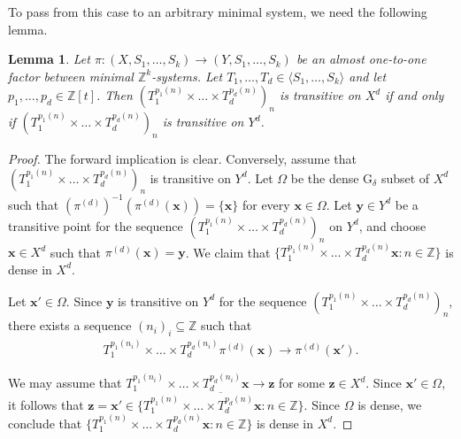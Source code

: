 \documentclass[11pt,reqno]{amsart}
\newcommand{\Z}{\mathbb{Z}}
\newcommand{\bx}{{\boldsymbol x}}
\newcommand{\by}{{\boldsymbol y}}
\newcommand{\bz}{{\boldsymbol z}}
\newtheorem{lemma}[lemma]{Lemma}
\theoremstyle{definition}
\theoremstyle{remark}
\begin{document}
To pass from this case to an arbitrary minimal system, we need the following lemma.

\begin{lemma}\label{lemma: lift_transitive_almost_onetoone}
    Let $\pi\colon (X,S_1,\dots,S_k)\to (Y,S_1,\dots,S_k)$ be an almost one-to-one factor between minimal $\Z^k$-systems. Let $T_1,\dots,T_d\in \langle S_1,\dots,S_k\rangle$ and let $p_1,\dots,p_d\in \Z[t]$. Then $(T_1^{p_1(n)}\times \dots\times T_{d}^{p_{d}(n)})_{n}$ is transitive on $X^d$ if and only if $(T_1^{p_1(n)}\times \dots\times T_{d}^{p_{d}(n)})_{n}$ is transitive on $Y^d$.
\end{lemma}


\begin{proof}
    The forward implication is clear. Conversely, assume that $(T_1^{p_1(n)}\times \dots\times T_{d}^{p_{d}(n)})_{n}$ is transitive on $Y^d$. Let $\Omega$ be the dense G$_\delta$ subset of $X^d$ such that $(\pi^{(d)})^{-1}(\pi^{(d)}(\bx))=\{\bx\}$ for every $\bx\in\Omega$. Let $\by\in Y^d$ be a transitive point for the sequence $(T_1^{p_1(n)}\times \dots\times T_{d}^{p_{d}(n)})_{n}$ on $Y^d$, and choose $\bx\in X^d$ such that $\pi^{(d)}(\bx)=\by$. We claim that $\{T_1^{p_1(n)}\times \dots\times T_{d}^{p_{d}(n)} \bx:n\in \Z\}$ is dense in $X^d$. 

    Let $\bx'\in \Omega$. Since $\by$ is transitive on $Y^d$ for the sequence $(T_1^{p_1(n)}\times \dots\times T_{d}^{p_{d}(n)})_{n}$, there exists a sequence $(n_i)_i\subseteq \Z$ such that \begin{align*}
        T_1^{p_1(n_i)}\times \dots\times T_{d}^{p_{d}(n_i)} \pi^{(d)}(\bx) \to \pi^{(d)}(\bx').
    \end{align*}

    We may assume that $T_1^{p_1(n_i)}\times \dots\times T_{d}^{p_{d}(n_i)}\bx\to \bz$ for some $\bz\in X^d$. Since $\bx'\in\Omega$, it follows that $\bz=\bx' \in \overline{\{T_1^{p_1(n)}\times\dots\times T_{d}^{p_{d}(n)} \bx:n\in \Z\}}$. Since $\Omega$ is dense, we conclude that $\{T_1^{p_1(n)}\times \dots\times T_{d}^{p_{d}(n)} \bx:n\in \Z\}$ is dense in $X^d$.
\end{proof}
\end{document}
